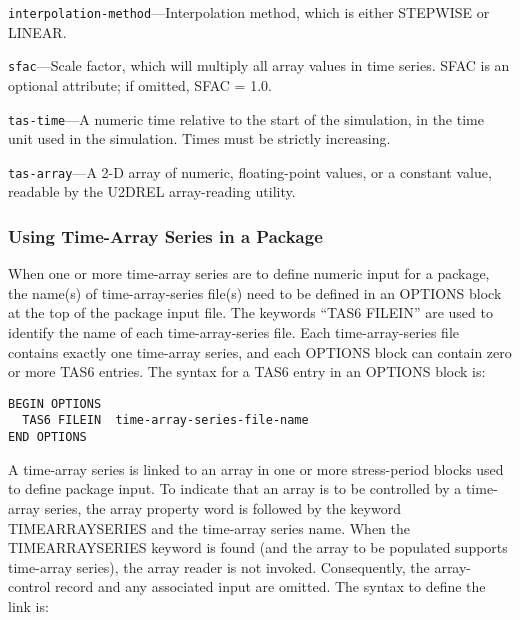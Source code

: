 \begin{description}
\item \texttt{interpolation-method}---Interpolation method, which is either STEPWISE or LINEAR.
\end{description}

\begin{description}
\item \texttt{sfac}---Scale factor, which will multiply all array values in time series. SFAC is an optional attribute; if omitted, SFAC = 1.0.
\end{description}

\begin{description}
\item \texttt{tas-time}---A numeric time relative to the start of the simulation, in the time unit used in the simulation. Times must be strictly increasing.
\end{description}

\begin{description}
\item \texttt{tas-array}---A 2-D array of numeric, floating-point values, or a constant value, readable by the U2DREL array-reading utility.
\end{description}

\subsubsection{Using Time-Array Series in a Package}
When one or more time-array series are to define numeric input for a package, the name(s) of time-array-series file(s) need to be defined in an OPTIONS block at the top of the package input file. The keywords ``TAS6 FILEIN'' are used to identify the name of each time-array-series file. Each time-array-series file contains exactly one time-array series, and each OPTIONS block can contain zero or more TAS6 entries. The syntax for a TAS6 entry in an OPTIONS block is:

\begin{lstlisting}[style=blockdefinition]
BEGIN OPTIONS
  TAS6 FILEIN  time-array-series-file-name
END OPTIONS
\end{lstlisting}

A time-array series is linked to an array in one or more stress-period blocks used to define package input. To indicate that an array is to be controlled by a time-array series, the array property word is followed by the keyword TIMEARRAYSERIES and the time-array series name. When the TIMEARRAYSERIES keyword is found (and the array to be populated supports time-array series), the array reader is not invoked. Consequently, the array-control record and any associated input are omitted. The syntax to define the link is:

